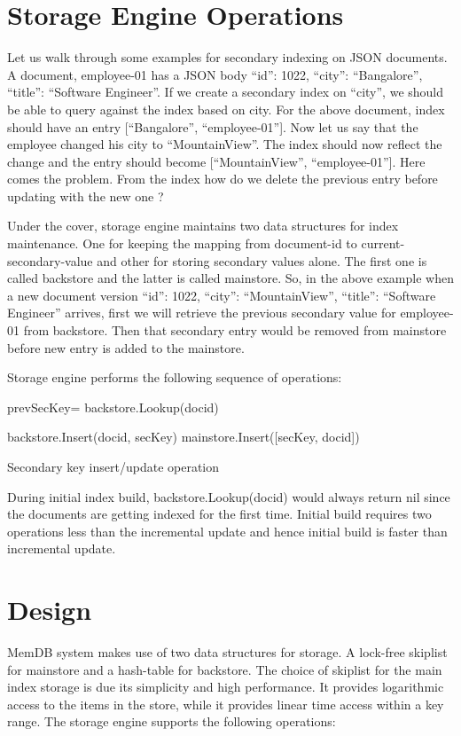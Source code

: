 \documentclass{vldb}
\begin{document}
\section{Storage Engine Operations}
Let us walk through some examples for secondary indexing on JSON documents. A document, employee-01 has a JSON body {“id”: 1022, “city”: “Bangalore”, “title”: “Software Engineer”}. If we create a secondary index on “city”, we should be able to query against the index based on city. For the above document, index should have an entry [“Bangalore”, “employee-01”]. Now let us say that the employee changed his city to “MountainView”. The index should now reflect the change and the entry should become [“MountainView”, “employee-01”]. Here comes the problem. From the index how do we delete the previous entry before updating with the new one ?

    Under the cover, storage engine maintains two data structures for index maintenance.  One for keeping the mapping from document-id to current-secondary-value and other for storing secondary values alone. The first one is called backstore and the latter is called mainstore. So, in the above example when a new document version {“id”: 1022, “city”: “MountainView”, “title”: “Software Engineer”} arrives, first we will retrieve the previous secondary value for employee-01 from backstore. Then that secondary entry would be removed from mainstore before new entry is added to the mainstore.
    

  Storage engine performs the following sequence of operations:
  
\begin{algorithm}
\SetAlgoLined
{}
 \BlankLine
prevSecKey= backstore.Lookup(docid)\;

   
   backstore.Insert(docid, secKey)\;
   mainstore.Insert([secKey, docid])\;
 \BlankLine
 \caption{Secondary key insert/update operation}
\end{algorithm}

During initial index build, backstore.Lookup(docid) would always return nil since the documents are getting indexed for the first time. Initial build requires two operations less than the incremental update and hence initial build is faster than incremental update.

\section{Design}
MemDB system makes use of two data structures for storage. A lock-free skiplist for mainstore and a hash-table for backstore. The choice of skiplist for the main index storage is due its simplicity and high performance. It provides logarithmic access to the items in the store, while it provides linear time access within a key range.  The storage engine supports the following operations:
\end{document}
